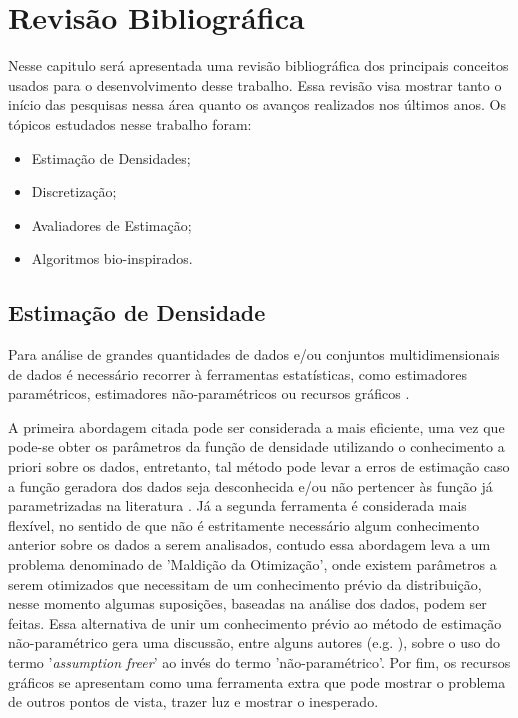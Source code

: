 \chapter{Revisão Bibliográfica}\label{cap:rev}

Nesse capitulo será apresentada uma revisão bibliográfica dos principais conceitos usados para o desenvolvimento desse trabalho. Essa revisão visa mostrar tanto o início das pesquisas nessa área quanto os avanços realizados nos últimos anos. Os tópicos estudados nesse trabalho foram:

\begin{itemize}
	\item Estimação de Densidades;
	\item Discretização;
	\item Avaliadores de Estimação;
	\item Algoritmos bio-inspirados.
\end{itemize}

\section{Estimação de Densidade}

Para análise de grandes quantidades de dados e/ou conjuntos multidimensionais de dados é necessário recorrer à ferramentas estatísticas, como estimadores paramétricos, estimadores não-paramétricos ou recursos gráficos \cite{scott2015multivariate}. 

A primeira abordagem citada pode ser considerada a mais eficiente, uma vez que pode-se obter os parâmetros da função de densidade utilizando o conhecimento a priori sobre os dados, entretanto, tal método pode levar a erros de estimação caso a função geradora dos dados seja desconhecida e/ou não pertencer às função já parametrizadas na literatura \cite{sheskin2003handbook}. Já a segunda ferramenta é considerada mais flexível, no sentido de que não é estritamente necessário algum conhecimento anterior sobre os dados a serem analisados, contudo essa abordagem leva a um problema denominado de 'Maldição da Otimização', onde existem parâmetros a serem otimizados que necessitam de um conhecimento prévio da distribuição, nesse momento algumas suposições, baseadas na análise dos dados, podem ser feitas. Essa alternativa de unir um conhecimento prévio ao método de estimação não-paramétrico gera uma discussão, entre alguns autores (e.g.  \cite{marascuilo1977nonparametric}), sobre o uso do termo '\textit{assumption freer}' ao invés do termo 'não-paramétrico'. Por fim, os recursos gráficos se apresentam como uma ferramenta extra que pode mostrar o problema de outros pontos de vista, trazer luz e mostrar o inesperado.

